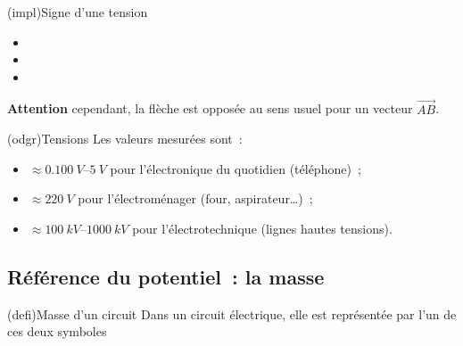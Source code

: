 \documentclass[../../main/main.tex]{subfiles}
\begin{document}
\begin{tcb}[label=impl:tension](impl){Signe d'une tension}
	\begin{itemize}
		\item
		\item
		\item
	\end{itemize}
	\begin{center}
		\textbf{Attention} cependant, la flèche est opposée au sens usuel pour
		un vecteur $\overrightarrow{AB}$.
	\end{center}
\end{tcb}
\begin{tcb}[label=odgr:tensions](odgr){Tensions}
	Les valeurs mesurées sont~:
	\begin{itemize}
		\item $\approx \SIrange{0.100}{5}{V}$ pour l'électronique du
		      quotidien (téléphone)~;
		\item $\approx \SI{220}{V}$ pour l'électroménager (four,
		      aspirateur…)~;
		\item $\approx \SIrange{100}{1000}{kV}$ pour l'électrotechnique
		      (lignes hautes tensions).
	\end{itemize}
\end{tcb}

\subsection{Référence du potentiel~: la masse}

\begin{tcb}[label=def:masse, sidebyside](defi){Masse d'un circuit}
	\vspace{-15pt}
	\tcblower
	Dans un circuit électrique, elle est représentée par l'un de ces deux
	symboles
	\begin{center}
	\end{center}
\end{tcb}
\end{document}

